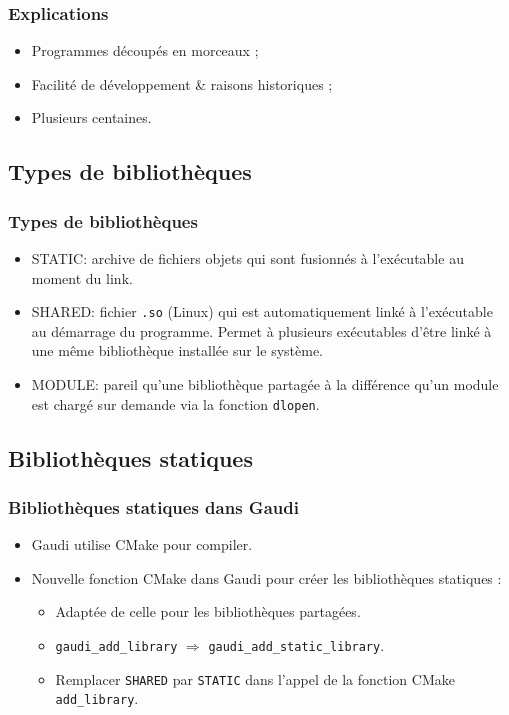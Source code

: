 \documentclass{beamer}
\begin{document}
\begin{frame}[fragile]
    \frametitle{Explications}

    \begin{itemize}
        \item Programmes découpés en morceaux ;
        \item Facilité de développement \& raisons historiques ;
        \item Plusieurs centaines.
    \end{itemize}
\end{frame}

\subsection{Types de bibliothèques}

\begin{frame}[fragile]
    \frametitle{Types de bibliothèques}

    \begin{itemize}
        \item STATIC: archive de fichiers objets qui sont fusionnés à l'exécutable au moment du link.
        \item SHARED: fichier \verb'.so' (Linux) qui est automatiquement linké à l'exécutable au démarrage du programme.
              Permet à plusieurs exécutables d'être linké à une même bibliothèque installée sur le système.
        \item MODULE: pareil qu'une bibliothèque partagée à la différence qu'un module est chargé sur demande via la fonction \verb'dlopen'.
    \end{itemize}
\end{frame}

\subsection{Bibliothèques statiques}

\begin{frame}[fragile]
    \frametitle{Bibliothèques statiques dans Gaudi}

    \begin{itemize}
        \item Gaudi utilise CMake pour compiler.
        \item Nouvelle fonction CMake dans Gaudi pour créer les bibliothèques statiques :
              \begin{itemize}
                  \item Adaptée de celle pour les bibliothèques partagées.
                  \item \verb'gaudi_add_library' $\Rightarrow$ \verb'gaudi_add_static_library'.
                  \item Remplacer \verb'SHARED' par \verb'STATIC' dans l'appel de la fonction CMake \verb'add_library'.
              \end{itemize}
    \end{itemize}
\end{frame}
\end{document}
